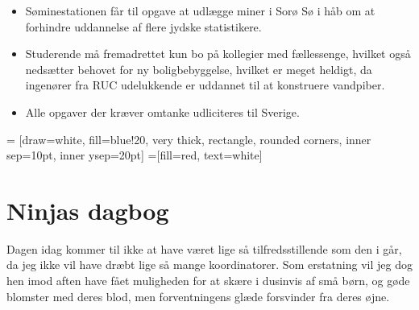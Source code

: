 \begin{minipage}[b]{0.95\linewidth}
\begin{minipage}[t]{0.47\textwidth}
\begin{itemize}
\item Søminestationen får til opgave at udlægge miner i Sorø Sø i håb om at forhindre uddannelse af flere jydske statistikere.
\item Studerende må fremadrettet kun bo på kollegier med fællessenge, hvilket også nedsætter behovet for ny boligbebyggelse, hvilket er meget heldigt, da ingenører fra RUC udelukkende er uddannet til at konstruere vandpiber.
\item Alle opgaver der kræver omtanke udliciteres til Sverige.
\end{itemize}

\end{minipage}
\hfill\begin{minipage}[t]{0.47\textwidth}

\vspace{1mm}
 = [draw=white, fill=blue!20, very thick,
    rectangle, rounded corners, inner sep=10pt, inner ysep=20pt]
 =[fill=red, text=white]

%

\section*{Ninjas dagbog}
Dagen idag kommer til ikke at have været lige så tilfredsstillende som den i går, da jeg ikke vil have dræbt lige så mange koordinatorer. Som erstatning vil jeg dog hen imod aften have fået muligheden for at skære i dusinvis af små børn, og gøde blomster med deres blod, men forventningens glæde forsvinder fra deres øjne.


\end{minipage}
\end{minipage}
